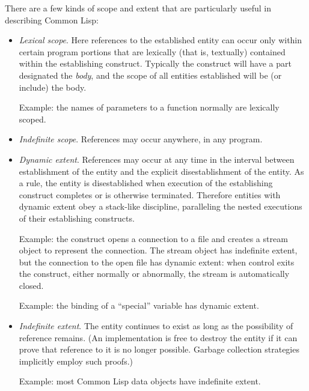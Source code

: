 There are a few kinds of scope and extent that are particularly useful
in describing Common Lisp:

\begin{itemize}
\item
\emph{Lexical scope}.  Here references to the established
entity can occur only within certain program portions that are
lexically (that is, textually) contained within the establishing construct.
Typically the construct will have a part designated the \emph{body},
and the scope of all entities established will be (or include) the body.

Example: the names of parameters to a function normally are lexically scoped.

\item
\emph{Indefinite scope}.  References may occur anywhere, in any program.

\item
\emph{Dynamic extent}.  References may occur at any time in the interval
between establishment of the entity and the explicit disestablishment
of the entity.  As a rule, the entity is disestablished when execution
of the establishing construct completes or is otherwise terminated.
Therefore entities with dynamic extent obey a stack-like discipline,
paralleling the nested executions of their establishing constructs.

Example: the  construct opens a connection to a file
and creates a stream object to represent the connection.  The stream object
has indefinite extent, but the connection to the open file has dynamic extent:
when control exits the  construct, either normally
or abnormally, the stream is automatically closed.

Example: the binding of a ``special'' variable has dynamic extent.

\item
\emph{Indefinite extent}.  The entity continues to exist as long as the
possibility of reference remains.  (An implementation is free to
destroy the entity if it can prove that reference to it is no longer possible.
Garbage collection strategies implicitly employ such proofs.)

Example: most Common Lisp data objects have indefinite extent.


\end{itemize}
